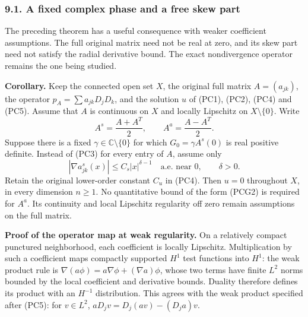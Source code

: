 \documentclass[
  11pt,
]{article}
\makeatletter
\let\ReaderOriginalAnchorStart\hyper@anchorstart
\let\ReaderOriginalAnchorEnd\hyper@anchorend
\let\ReaderPendingAliases\@empty
\def\ReaderArmAliases#1{\gdef\ReaderPendingAliases{#1}}
\def\hyper@anchorstart#1{\ReaderIfNativeAnchorTF{#1}{\ReaderPendingAliases\global\let\ReaderPendingAliases\@empty}{}\ReaderOriginalAnchorStart{#1}}
\makeatother
\begin{document}
\ReaderArmAliases{\ReaderOriginalAnchorStart{AN03-PCU-PHASE-001}\ReaderOriginalAnchorEnd\begingroup\expandafter\def\csname @currentHref\endcsname{AN03-PCU-PHASE-001}\label{AN03-PCU-PHASE-001}\endgroup\ReaderOriginalAnchorStart{a-fixed-complex-phase-and-a-free-skew-part}\ReaderOriginalAnchorEnd}
\subsubsection{9.1. A fixed complex phase and a free skew
part}\label{a-fixed-complex-phase-and-a-free-skew-part}

The preceding theorem has a useful consequence with weaker coefficient
assumptions. The full original matrix need not be real at zero, and its
skew part need not satisfy the radial derivative bound. The exact
nondivergence operator remains the one being studied.

\textbf{Corollary.} Keep the connected open set \(X\), the original full
matrix \(A=(a_{jk})\), the operator \(p_A=\sum a_{jk}D_jD_k\), and the
solution \(u\) of (PC1), (PC2), (PC4) and (PC5). Assume that \(A\) is
continuous on \(X\) and locally Lipschitz on \(X\setminus\{0\}\). Write
\[
 A^s=\frac{A+A^T}{2},\qquad A^a=\frac{A-A^T}{2}.
 \tag{PCG1}
\] Suppose there is a fixed \(\gamma\in\mathbb C\setminus\{0\}\) for
which \(G_0=\gamma A^s(0)\) is real positive definite. Instead of (PC3)
for every entry of \(A\), assume only \[
 |\nabla a^s_{jk}(x)|\leq C_s|x|^{\delta-1}
 \quad\text{a.e. near }0,\qquad\delta>0.
 \tag{PCG2}
\] Retain the original lower-order constant \(C_u\) in (PC4). Then
\(u=0\) throughout \(X\), in every dimension \(n\geq1\). No quantitative
bound of the form (PCG2) is required for \(A^a\). Its continuity and
local Lipschitz regularity off zero remain assumptions on the full
matrix.

\textbf{Proof of the operator map at weak regularity.} On a relatively
compact punctured neighborhood, each coefficient is locally Lipschitz.
Multiplication by such a coefficient maps compactly supported \(H^1\)
test functions into \(H^1\): the weak product rule is
\(\nabla(a\phi)=a\nabla\phi+(\nabla a)\phi\), whose two terms have
finite \(L^2\) norms bounded by the local coefficient and derivative
bounds. Duality therefore defines its product with an \(H^{-1}\)
distribution. This agrees with the weak product specified after (PC5):
for \(v\in L^2\), \(aD_jv=D_j(av)-(D_ja)v\).
\end{document}
